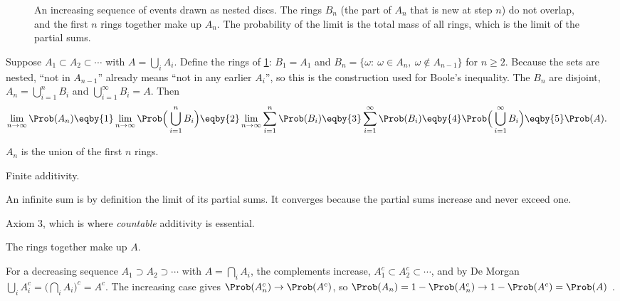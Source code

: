 \begin{figure}[htbp]
\centering
{}
\caption{An increasing sequence of events drawn as nested discs. The rings
$B_n$ (the part of $A_n$ that is new at step $n$) do not overlap, and the
first $n$ rings together make up $A_n$. The probability of the limit is the
total mass of all rings, which is the limit of the partial sums.}
\label{1a:fig:continuity}
\end{figure}

Suppose $A_1\subset A_2\subset\cdots$ with $A=\bigcup_iA_i$. Define the rings of
\cref{1a:fig:continuity}: $B_1=A_1$ and
$B_n=\{\omega:\ \omega\in A_n,\ \omega\notin A_{n-1}\}$ for $n\ge2$. Because the sets
are nested, ``not in $A_{n-1}$'' already means ``not in any earlier $A_i$'',
so this is the construction used for Boole's inequality. The $B_n$ are disjoint,
$A_n=\bigcup_{i=1}^nB_i$ and $\bigcup_{i=1}^\infty B_i=A$. Then
\begin{align*}
\lim_{n\to\infty}\Prob(A_n)
&\eqby{1}\lim_{n\to\infty}\Prob\Bigl(\,\bigcup_{i=1}^nB_i\Bigr)
 \eqby{2}\lim_{n\to\infty}\sum_{i=1}^n\Prob(B_i)
 \eqby{3}\sum_{i=1}^\infty\Prob(B_i)
 \eqby{4}\Prob\Bigl(\,\bigcup_{i=1}^\infty B_i\Bigr)
 \eqby{5}\Prob(A).
\end{align*}
\begin{explain}
  \item $A_n$ is the union of the first $n$ rings.
  \item Finite additivity.
  \item An infinite sum is by definition the limit of its partial sums. It
        converges because the partial sums increase and never exceed one.
  \item Axiom 3, which is where \emph{countable} additivity is essential.
  \item The rings together make up $A$.
\end{explain}
For a decreasing sequence $A_1\supset A_2\supset\cdots$ with $A=\bigcap_iA_i$, the
complements increase, $A_1^c\subset A_2^c\subset\cdots$, and by De Morgan
$\bigcup_iA_i^c=\bigl(\bigcap_iA_i\bigr)^c=A^c$. The increasing case gives
$\Prob(A_n^c)\to\Prob(A^c)$, so
$\Prob(A_n)=1-\Prob(A_n^c)\to1-\Prob(A^c)=\Prob(A)$ .

